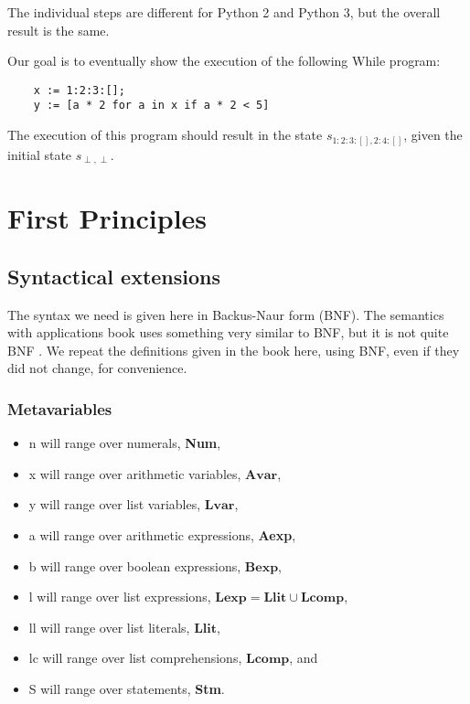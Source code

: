 \documentclass[12pt]{article}
\newcommand{\metavar}[1]{\textlangle#1\textrangle}
\newcommand{\Avar}{\mathbf{Avar}}
\newcommand{\Lvar}{\mathbf{Lvar}}
\newcommand{\Bexp}{\mathbf{Bexp}}
\newcommand{\Lexp}{\mathbf{Lexp}}
\newcommand{\Llit}{\mathbf{Llit}}
\newcommand{\Lcomp}{\mathbf{Lcomp}}
\begin{document}
The individual steps are different for Python 2 and Python 3, but the overall result is the same.

Our goal is to eventually show the execution of the following While program:

\begin{lstlisting}
    x := 1:2:3:[];
    y := [a * 2 for a in x if a * 2 < 5]
\end{lstlisting}

The execution of this program should result in the state $s_{1:2:3:[], 2:4:[]}$, given the initial state $s_{\perp, \perp}$.

\section{First Principles}

\subsection{Syntactical extensions}

The syntax we need is given here in Backus-Naur form (BNF). The semantics with applications book uses something very similar to BNF, but it is not quite BNF \cite[section 1.2]{wiley}. We repeat the definitions given in the book here, using BNF, even if they did not change, for convenience.

\subsubsection{Metavariables}

\begin{itemize}
    \item \metavar{n} will range over numerals, \textbf{Num},
    \item \metavar{x} will range over arithmetic variables, $\Avar$,
    \item \metavar{y} will range over list variables, $\Lvar$,
    \item \metavar{a} will range over arithmetic expressions, \textbf{Aexp},
    \item \metavar{b} will range over boolean expressions, $\Bexp$,
    \item \metavar{l} will range over list expressions, $\Lexp = \Llit \cup \Lcomp$,
    \item \metavar{ll} will range over list literals, $\Llit$,
    \item \metavar{lc} will range over list comprehensions, $\Lcomp$, and
    \item \metavar{S} will range over statements, \textbf{Stm}.
\end{itemize}
\end{document}
